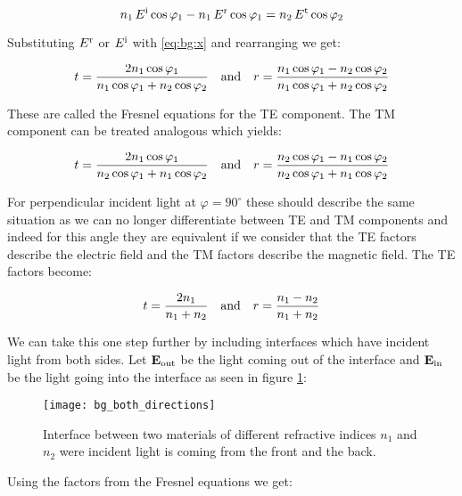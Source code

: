 \begin{equation}
    n_1 \, E^{\mathrm{i}} \cos \varphi_1 - n_1 \, E^{\mathrm{r}} \cos \varphi_1 =
    n_2 \, E^{\mathrm{t}} \cos \varphi_2
\end{equation}

Substituting $E^{\mathrm{r}}$ or $E^{\mathrm{i}}$ with \eqref{eq:bg:x} and rearranging we get:

\begin{equation}
    t = \frac{2 n_1 \cos \varphi_1}{n_1 \cos \varphi_1 + n_2 \cos \varphi_2}
    \qq{and}
    r = \frac{n_1 \cos \varphi_1 - n_2 \cos \varphi_2}{
    n_1 \cos \varphi_1 + n_2 \cos \varphi_2}
\end{equation}

These are called the Fresnel equations for the TE component. The TM component can be treated analogous which yields:

\begin{equation}
    t = \frac{2 n_1 \cos \varphi_1}{n_2 \cos \varphi_1 + n_1 \cos \varphi_2}
    \qq{and}
    r = \frac{n_2 \cos \varphi_1 - n_1 \cos \varphi_2}{
    n_2 \cos \varphi_1 + n_1 \cos \varphi_2}
\end{equation}

For perpendicular incident light at $\varphi = 90^\circ$ these should describe the same situation as we can no longer differentiate between TE and TM components and indeed for this angle they are equivalent if we consider that the TE factors describe the electric field and the TM factors describe the magnetic field. The TE factors become:

\begin{equation}
    t = \frac{2 n_1}{n_1 + n_2} \qq{and} r = \frac{n_1 - n_2}{n_1 + n_2}
\end{equation}

We can take this one step further by including interfaces which have incident light from both sides. Let $\vb E_{\mathrm{out}}$ be the light coming out of the interface and $\vb E_{\mathrm{in}}$ be the light going into the interface as seen in figure \ref{fig:bg:both}:

\begin{figure}[H]
    \centering
    \texttt{[image: bg\_both\_directions]}
    \caption{Interface between two materials of different refractive indices $n_1$ and $n_2$ were incident light is coming from the front and the back.}
    \label{fig:bg:both}
\end{figure}

Using the factors from the Fresnel equations we get:

